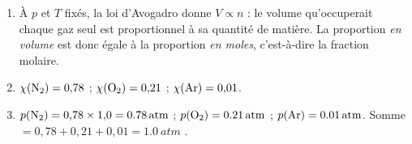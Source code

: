 \documentclass[11pt,a4paper]{article}
\begin{document}
\begin{corrige}
\begin{enumerate}[label=\alph*)]
  \item À $p$ et $T$ fixés, la loi d'Avogadro donne $V\propto n$ : le volume qu'occuperait chaque gaz
        seul est proportionnel à sa quantité de matière. La proportion \emph{en volume} est donc égale
        à la proportion \emph{en moles}, c'est-à-dire la fraction molaire.
  \item $\chi(\ce{N2})=0{,}78$ ; $\chi(\ce{O2})=0{,}21$ ; $\chi(\ce{Ar})=0{,}01$.
  \item $p(\ce{N2})=0{,}78\times1{,}0=\qty{0.78}{atm}$ ; $p(\ce{O2})=\qty{0.21}{atm}$ ;
        $p(\ce{Ar})=\qty{0.01}{atm}$. Somme $=0{,}78+0{,}21+0{,}01=\qty{1.0}{atm}$ \checkmark.
\end{enumerate}
\end{corrige}
\end{document}
